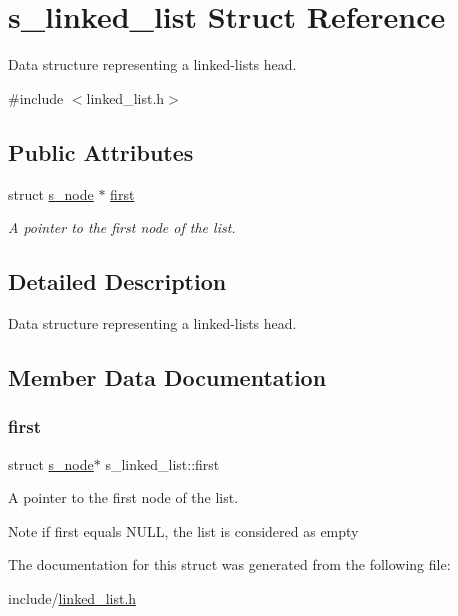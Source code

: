 \hypertarget{structs__linked__list}{}\section{s\+\_\+linked\+\_\+list Struct Reference}
\label{structs__linked__list}


Data structure representing a linked-\/list\textquotesingle{}s head.  




{\ttfamily \#include $<$linked\+\_\+list.\+h$>$}

\subsection*{Public Attributes}
\begin{DoxyCompactItemize}
\item 
struct \hyperlink{structs__node}{s\+\_\+node} $\ast$ \hyperlink{structs__linked__list_a295db8f477f3ed634c2a2e71004d02e8}{first}
\begin{DoxyCompactList}\small\item\em A pointer to the first node of the list. \end{DoxyCompactList}\end{DoxyCompactItemize}


\subsection{Detailed Description}
Data structure representing a linked-\/list\textquotesingle{}s head. 

\subsection{Member Data Documentation}
\mbox{\label{structs__linked__list_a295db8f477f3ed634c2a2e71004d02e8}} 
\subsubsection{\texorpdfstring{first}{first}}
{\footnotesize\ttfamily struct \hyperlink{structs__node}{s\+\_\+node}$\ast$ s\+\_\+linked\+\_\+list\+::first}



A pointer to the first node of the list. 

\begin{DoxyNote}{Note}
if first equals N\+U\+LL, the list is considered as empty 
\end{DoxyNote}


The documentation for this struct was generated from the following file\+:\begin{DoxyCompactItemize}
\item 
include/\hyperlink{linked__list_8h}{linked\+\_\+list.\+h}\end{DoxyCompactItemize}
